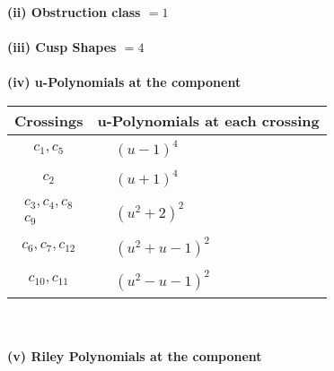 \documentclass[1p]{elsarticle_modified}
\theoremstyle{definition}
\begin{document}
\flushleft \textbf{(ii) Obstruction class $= 1$}\\~\\
\flushleft \textbf{(iii) Cusp Shapes $= 4$}\\~\\
\newpage\renewcommand{\arraystretch}{1}
\flushleft \textbf{(iv) u-Polynomials at the component}\newline \\
\begin{tabular}{m{50pt}|m{274pt}}
Crossings & \hspace{64pt}u-Polynomials at each crossing \\
\hline $$\begin{aligned}c_{1},c_{5}\end{aligned}$$&$\begin{aligned}
&(u-1)^4
\end{aligned}$\\
\hline $$\begin{aligned}c_{2}\end{aligned}$$&$\begin{aligned}
&(u+1)^4
\end{aligned}$\\
\hline $$\begin{aligned}c_{3},c_{4},c_{8}\\c_{9}\end{aligned}$$&$\begin{aligned}
&(u^2+2)^2
\end{aligned}$\\
\hline $$\begin{aligned}c_{6},c_{7},c_{12}\end{aligned}$$&$\begin{aligned}
&(u^2+u-1)^2
\end{aligned}$\\
\hline $$\begin{aligned}c_{10},c_{11}\end{aligned}$$&$\begin{aligned}
&(u^2- u-1)^2
\end{aligned}$\\
\hline
\end{tabular}\\~\\
\newpage\renewcommand{\arraystretch}{1}
\flushleft \textbf{(v) Riley Polynomials at the component}\newline \\
\end{document}
